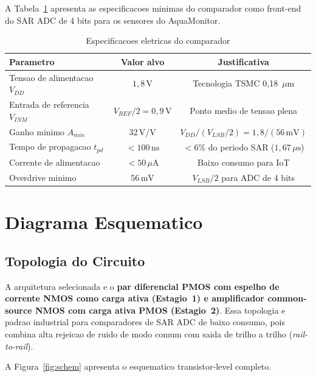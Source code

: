 \documentclass[12pt, a4paper]{article}
\begin{document}
A Tabela~\ref{tab:specs} apresenta as especificacoes minimas do comparador como
front-end do SAR ADC de 4 bits para os sensores do AquaMonitor.

\begin{table}[H]
\centering
\caption{Especificacoes eletricas do comparador}
\label{tab:specs}
\begin{tabular}{lcc}
\toprule
\textbf{Parametro}             & \textbf{Valor alvo}  & \textbf{Justificativa} \\
\midrule
Tensao de alimentacao $V_{DD}$ & $1{,}8\,\text{V}$    & Tecnologia TSMC 0{,}18~$\mu$m \\
Entrada de referencia $V_{INM}$& $V_{REF}/2 = 0{,}9\,\text{V}$ & Ponto medio de tensao plena \\
Ganho minimo $A_{min}$         & $32\,\text{V/V}$     & $V_{DD}/(V_{LSB}/2) = 1{,}8/(56\,\text{mV})$ \\
Tempo de propagacao $t_{pd}$   & $<100\,\text{ns}$    & $< 6\%$ do periodo SAR ($1{,}67\,\mu\text{s}$) \\
Corrente de alimentacao        & $<50\,\mu\text{A}$   & Baixo consumo para IoT \\
Overdrive minimo               & $56\,\text{mV}$      & $V_{LSB}/2$ para ADC de 4 bits \\
\bottomrule
\end{tabular}
\end{table}

\section{Diagrama Esquematico}

\subsection{Topologia do Circuito}

A arquitetura selecionada e o \textbf{par diferencial PMOS com espelho de corrente
NMOS como carga ativa (Estagio~1) e amplificador common-source NMOS com carga
ativa PMOS (Estagio~2)}. Essa topologia e padrao industrial para comparadores de
SAR ADC de baixo consumo, pois combina alta rejeicao de ruido de modo comum com
saida de trilho a trilho (\textit{rail-to-rail}).

A Figura~\ref{fig:schem} apresenta o esquematico transistor-level completo.
\end{document}

